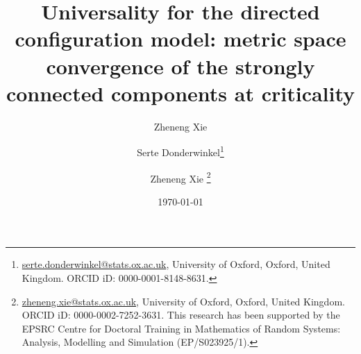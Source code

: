 \documentclass[notitlepage,11pt, a4paper]{article}
\title{Universality for the directed configuration model: metric space convergence of the strongly connected components at criticality}
\author{ \and Zheneng Xie}
\author{Serte Donderwinkel\thanks{\href{mailto:serte.donderwinkel@stats.ox.ac.uk}{serte.donderwinkel@stats.ox.ac.uk}, University of Oxford, Oxford, United Kingdom. ORCID iD: 0000-0001-8148-8631.} \and Zheneng Xie \thanks{\href{zheneng.xie@stats.ox.ac.uk}{zheneng.xie@stats.ox.ac.uk}, University of Oxford, Oxford, United Kingdom. ORCID iD: 0000-0002-7252-3631. This research has been supported by the EPSRC Centre for Doctoral Training in Mathematics of Random Systems: Analysis, Modelling and Simulation (EP/S023925/1).}}
\date{\today}
\begin{document}
\maketitle










\newpage 

\begin{appendices}
%


\end{appendices}



\end{document}
